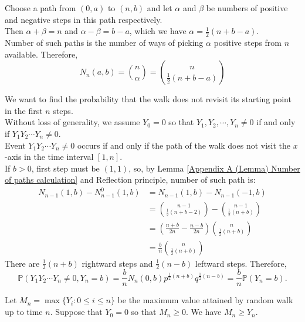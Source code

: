 \documentclass{huhtakm-template-book}
\newcommand{\prob}{\mathbb{P}}
\begin{document}
\begin{proofing}
	Choose a path from $(0,a)$ to $(n,b)$ and let $\alpha$ and $\beta$ be numbers of positive and negative steps in this path respectively.\\
	Then $\alpha+\beta=n$ and $\alpha-\beta=b-a$, which we have $\alpha=\frac{1}{2}(n+b-a)$.\\
	Number of such paths is the number of ways of picking $\alpha$ positive steps from $n$ available. Therefore,
	\begin{equation*}
		N_{n}(a,b)=\binom{n}{\alpha}=\binom{n}{\frac{1}{2}(n+b-a)}
	\end{equation*}
\end{proofing}
\begin{eg}
	We want to find the probability that the walk does not revisit its starting point in the first $n$ steps.\\
	Without loss of generality, we assume $Y_{0}=0$ so that $Y_{1},Y_{2},\cdots,Y_{n}\neq 0$ if and only if $Y_{1}Y_{2}\cdots Y_{n}\neq 0$.\\
	Event $Y_{1}Y_{2}\cdots Y_{n}\neq 0$ occurs if and only if the path of the walk does not visit the $x$-axis in the time interval $[1,n]$.\\
	If $b>0$, first step must be $(1,1)$, so, by Lemma \ref{Appendix A (Lemma) Number of paths calculation} and Reflection principle, number of such path is:
	\begin{align*}
		N_{n-1}(1,b)-N_{n-1}^{0}(1,b)&=N_{n-1}(1,b)-N_{n-1}(-1,b)\\
		&=\binom{n-1}{\frac{1}{2}(n+b-2)}-\binom{n-1}{\frac{1}{2}(n+b)}\\
		&=\left(\frac{n+b}{2n}-\frac{n-b}{2n}\right)\binom{n}{\frac{1}{2}(n+b)}\\
		&=\frac{b}{n}\binom{n}{\frac{1}{2}(n+b)}
	\end{align*}
	There are $\frac{1}{2}(n+b)$ rightward steps and $\frac{1}{2}(n-b)$ leftward steps. Therefore,
	\begin{equation*}
		\prob(Y_{1}Y_{2}\cdots Y_{n}\neq 0,Y_{n}=b)=\frac{b}{n}N_{n}(0,b)p^{\frac{1}{2}(n+b)}q^{\frac{1}{2}(n-b)}=\frac{b}{n}\prob(Y_{n}=b).
	\end{equation*}
\end{eg}
\begin{eg}
	Let $M_{n}=\max\{Y_{i}:0\leq i\leq n\}$ be the maximum value attained by random walk up to time $n$. Suppose that $Y_{0}=0$ so that $M_{n}\geq 0$. We have $M_{n}\geq Y_{n}$.
\end{eg}
\end{document}
